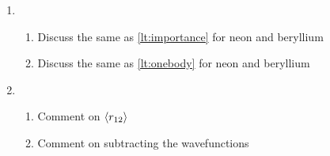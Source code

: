 \documentclass[11pt]{article}
\begin{document}
\begin{enumerate}
\item
	\begin{enumerate}
		\item Discuss the same as \ref{lt:importance} for neon and beryllium
		\item Discuss the same as \ref{lt:onebody} for neon and beryllium
	\end{enumerate}


\item 
	\begin{enumerate}
		\item Comment on \(\expval{r_{12}}\)
		\item Comment on subtracting the wavefunctions
	\end{enumerate}
\end{enumerate}




\end{document}
